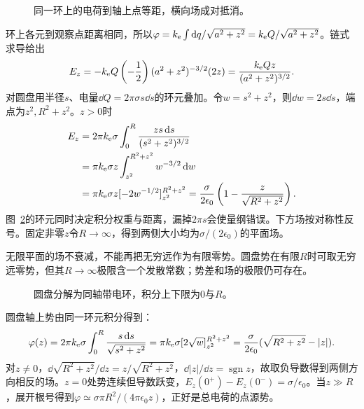 \begin{figure}[H]\centering
{}
\caption{同一环上的电荷到轴上点等距，横向场成对抵消。}\label{fig:es1-h2-q}
\end{figure}
\begin{solution}
环上各元到观察点距离相同，所以$\varphi=k_{\rm e}\int\mathop{}\!\mathrm d q/\sqrt{a^2+z^2}=k_{\rm e} Q/\sqrt{a^2+z^2}$。链式求导给出
\[E_z=-k_{\rm e} Q\left(-\frac12\right)(a^2+z^2)^{-3/2}(2z)
=\frac{k_{\rm e} Qz}{(a^2+z^2)^{3/2}}.\]
对圆盘用半径$s$、电量$\dd Q=2\pi\sigma s\dd s$的环元叠加。令$w=s^2+z^2$，则$\dd w=2s\dd s$，端点为$z^2,R^2+z^2$。$z>0$时
\[\begin{aligned}
E_z&=2\pi k_{\rm e}\sigma\int_0^R\frac{zs\mathop{}\!\mathrm d s}{(s^2+z^2)^{3/2}}\\
&=\pi k_{\rm e}\sigma z\int_{z^2}^{R^2+z^2}w^{-3/2}\mathop{}\!\mathrm d w\\
&=\pi k_{\rm e}\sigma z[-2w^{-1/2}]_{z^2}^{R^2+z^2}
=\frac\sigma{2\epsilon_0}\left(1-\frac z{\sqrt{R^2+z^2}}\right).
\end{aligned}\]
图~\ref{fig:es1-h2-s}的环元同时决定积分权重与距离，漏掉$2\pi s$会使量纲错误。下方场按对称性反号。固定非零$z$令$R\to\infty$，得到两侧大小均为$\sigma/(2\epsilon_0)$的平面场。

无限平面的场不衰减，不能再把无穷远作为有限零势。圆盘势在有限$R$时可取无穷远零势，但其$R\to\infty$极限含一个发散常数；势差和场的极限仍可存在。
\begin{figure}[H]\centering
{}
\caption{圆盘分解为同轴带电环，积分上下限为$0$与$R$。}\label{fig:es1-h2-s}
\end{figure}


圆盘轴上势由同一环元积分得到：
\[\varphi(z)=2\pi k_{\rm e}\sigma\int_0^R\frac{s\mathop{}\!\mathrm d s}{\sqrt{s^2+z^2}}
=\pi k_{\rm e}\sigma[2\sqrt w]_{z^2}^{R^2+z^2}
=\frac{\sigma}{2\epsilon_0}(\sqrt{R^2+z^2}-|z|).\]
对$z\ne0$，$\dd\sqrt{R^2+z^2}/\dd z=z/\sqrt{R^2+z^2}$，$\dd|z|/\dd z=\operatorname{sgn}z$，故取负导数得到两侧方向相反的场。$z=0$处势连续但导数跃变，$E_z(0^+)-E_z(0^-)=\sigma/\epsilon_0$。当$z\gg R$，展开根号得到$\varphi\simeq\sigma\pi R^2/(4\pi\epsilon_0z)$，正好是总电荷的点源势。
\end{solution}

